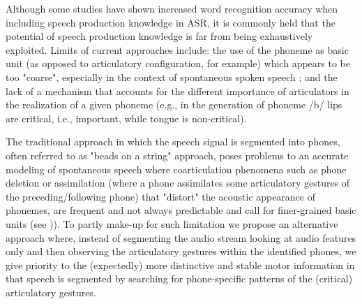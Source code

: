 Although some studies have shown increased word recognition accuracy when including speech production knowledge in ASR, it is commonly held that the potential of speech production knowledge is far from being exhaustively exploited. Limits of current approaches include: the use of the phoneme as basic unit (as opposed to articulatory configuration, for example) which appears to be too "coarse", especially in the context of spontaneous spoken speech
; and  the lack of a mechanism that accounts for the different importance of articulators in the realization of a given phoneme (e.g., in the generation of phoneme /b/ lips are critical, i.e., important, while tongue is non-critical).

The traditional approach in which the speech signal is segmented into phones, often referred to as "beads on a string" approach, poses problems to an accurate modeling of spontaneous speech where coarticulation phenomena such as phone deletion or assimilation (where a phone assimilates some articulatory gestures of the preceding/following phone) that "distort" the acoustic appearance of phonemes, are frequent and not always predictable and call for finer-grained basic units (see \cite{ostendorf})). To partly make-up for such limitation we propose an alternative approach where, instead of segmenting the audio stream looking at audio features only and then observing the articulatory gestures within the identified phones, we give priority to the (expectedly) more distinctive and stable motor information in that speech is segmented by searching for phone-specific patterns of the (critical) articulatory gestures.



